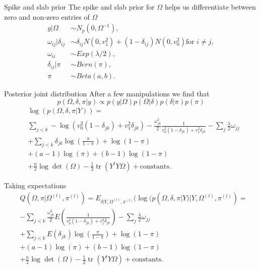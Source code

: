 \documentclass{beamer}
\DeclareMathOperator{\tr}{tr}
\begin{document}
\begin{frame}{Spike and slab prior}
	The spike and slab prior for $\Omega$ helps us differentiate between zero
	and non-zero entries of $\Omega$
	\begin{align*}
		y | \Omega                & \sim N_p(0, \Omega^{-1}),                                                          \\
		\omega_{ij} | \delta_{ij} & \sim \delta_{ij} N(0, v_1^2) + (1 - \delta_{ij}) N(0, v_0^2) \text{for } i \neq j, \\
		\omega_{ii}               & \sim Exp(\lambda/2),                                                               \\
		\delta_{ij} | \pi         & \sim Bern(\pi),                                                                    \\
		\pi                       & \sim Beta(a,b).
	\end{align*}
\end{frame}
\begin{frame}{Posterior joint distribution}
	After a few manipulations we find that
	\[ p(\Omega, \delta, \pi | y) \propto p(y | \Omega) p(\Omega | \delta) p(\delta | \pi) p(\pi) \]
	\begin{align*}
		 & \log(p(\Omega, \delta, \pi | Y)) =                                   \\
		 & \sum_{j<k} -\log(v_0^2 (1 - \delta_{jk}) + v_1^2 \delta_{jk})
		- \frac{\omega_{jk}^2}{2} \frac{1}{v_0^2 (1 - \delta_{jk}) + v_1^2
		\delta_{jk}} - \sum_j \frac{\lambda}{2} \omega_{jj}                     \\
		 & + \sum_{j<k} \delta_{jk} \log\left(\frac{\pi}{1-\pi}\right) + \log(1
		- \pi)                                                                  \\
		 & + (a - 1) \log(\pi) + (b - 1) \log(1 - \pi)                          \\
		 & + \frac{n}{2} \log\det(\Omega) - \frac{1}{2} \tr(Y^t Y \Omega)
		+ \text{constants.}
	\end{align*}
\end{frame}
\begin{frame}{Taking expectations}
	\begin{align*}
		 & Q(\Omega, \pi | \Omega^{(l)}, \pi^{(l)}) = E_{\delta | Y, \Omega^{(l)},
		\pi^{(l)}}(\log(p(\Omega, \delta, \pi | Y) | Y, \Omega^{(l)}, \pi^{(l)} ) =             \\
		 & - \sum_{j<k} \frac{\omega_{jk}^2}{2} E\left(\frac{1}{v_0^2 (1 - \delta_{jk}) + v_1^2
		\delta_{jk}}\right) - \sum_j \frac{\lambda}{2} \omega_{jj}                              \\
		 & + \sum_{j<k} E(\delta_{jk}) \log\left(\frac{\pi}{1-\pi}\right) + \log(1
		- \pi)                                                                                  \\
		 & + (a - 1) \log(\pi) + (b - 1) \log(1 - \pi)                                          \\
		 & + \frac{n}{2} \log\det(\Omega) - \frac{1}{2} \tr(Y^t Y \Omega)
		+ \text{constants.}
	\end{align*}
\end{frame}
\end{document}
